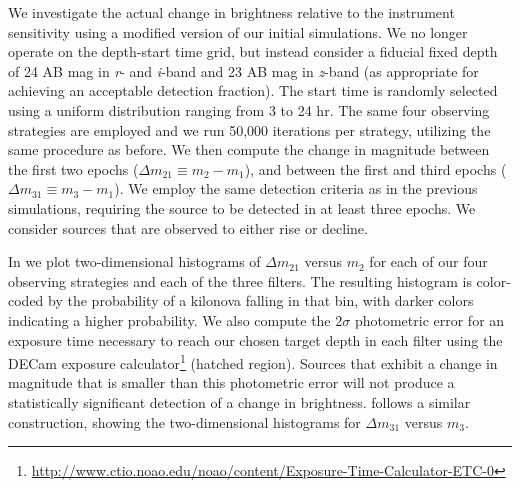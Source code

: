 \clearpage
We investigate the actual change in brightness relative to the instrument sensitivity using a modified version of our initial simulations. We no longer operate on the depth-start time grid, but instead consider a fiducial fixed depth of 24 AB mag in {\em r}- and {\em i}-band and 23 AB mag in {\em z}-band (as appropriate for achieving an acceptable detection fraction). The start time is randomly selected using a uniform distribution ranging from 3 to 24 hr. The same four observing strategies are employed and we run 50,000 iterations per strategy, utilizing the same procedure as before. We then compute the change in magnitude between the first two epochs ($\Delta m_{21} \equiv m_2 - m_1$), and between the first and third epochs ($\Delta m_{31} \equiv m_3 - m_1$). We employ the same detection criteria as in the previous simulations, requiring the source to be detected in at least three epochs. We consider sources that are observed to either rise or decline.

In  we plot two-dimensional histograms of $\Delta m_{21}$ versus $m_2$ for each of our four observing strategies and each of the three filters. The resulting histogram is color-coded by the probability of a kilonova falling in that bin, with darker colors indicating a higher probability. We also compute the $2\sigma$ photometric error for an exposure time necessary to reach our chosen target depth in each filter using the DECam exposure calculator\footnote{\url{http://www.ctio.noao.edu/noao/content/Exposure-Time-Calculator-ETC-0}} (hatched region). Sources that exhibit a change in magnitude that is smaller than this photometric error will not produce a statistically significant detection of a change in brightness.  follows a similar construction, showing the two-dimensional histograms for $\Delta m_{31}$ versus $m_3$.

